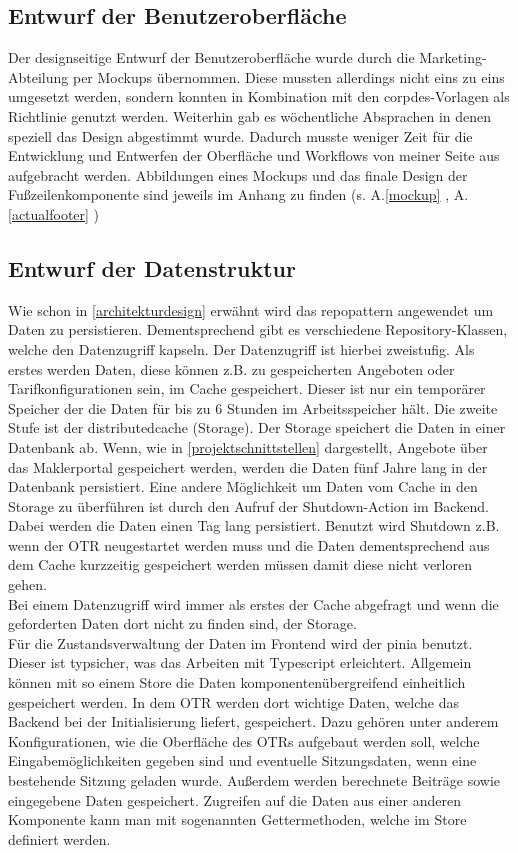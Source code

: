 \subsection{Entwurf der Benutzeroberfläche}
\label{benutzeroberfläche}
Der designseitige Entwurf der Benutzeroberfläche wurde durch die Marketing-Abteilung per Mockups übernommen. Diese mussten allerdings nicht eins zu eins umgesetzt werden, sondern konnten in Kombination mit den \gls{corpdes}-Vorlagen als Richtlinie genutzt werden. Weiterhin gab es wöchentliche Absprachen in denen speziell das Design abgestimmt wurde. Dadurch musste weniger Zeit für die Entwicklung und Entwerfen der Oberfläche und Workflows von meiner Seite aus aufgebracht werden. Abbildungen eines Mockups und das finale Design der Fußzeilenkomponente sind jeweils im Anhang zu finden (s. A.\ref{mockup} , A.\ref{actualfooter} )
\subsection{Entwurf der Datenstruktur}
\label{datenmodell}
Wie schon in \ref{architekturdesign}  erwähnt wird das \gls{repopattern} angewendet um Daten zu persistieren. Dementsprechend gibt es verschiedene Repository-Klassen, welche den Datenzugriff kapseln. Der Datenzugriff ist hierbei zweistufig. Als erstes werden Daten, diese können z.B. zu gespeicherten Angeboten oder Tarifkonfigurationen sein, im Cache gespeichert. Dieser ist nur ein temporärer Speicher der die Daten für bis zu 6 Stunden im Arbeitsspeicher hält. Die zweite Stufe ist der \gls{distributedcache} (Storage). Der Storage speichert die Daten in einer Datenbank ab.
Wenn, wie in \ref{projektschnittstellen}  dargestellt, Angebote über das Maklerportal gespeichert werden, werden die Daten fünf Jahre lang in der Datenbank persistiert. Eine andere Möglichkeit um Daten vom Cache in den Storage zu überführen ist durch den Aufruf der Shutdown-Action im Backend. Dabei werden die Daten einen Tag lang persistiert. Benutzt wird Shutdown z.B. wenn der \ac{OTR} neugestartet werden muss und die Daten dementsprechend aus dem Cache kurzzeitig gespeichert werden müssen damit diese nicht verloren gehen.\\
Bei einem Datenzugriff wird immer als erstes der Cache abgefragt und wenn die geforderten Daten dort nicht zu finden sind, der Storage.\\
Für die Zustandsverwaltung der Daten im Frontend wird der \gls{pinia} benutzt. Dieser ist typsicher, was das Arbeiten mit Typescript erleichtert. Allgemein können mit so einem Store die Daten komponentenübergreifend einheitlich gespeichert werden. In dem \ac{OTR} werden dort wichtige Daten, welche das Backend bei der Initialisierung liefert, gespeichert. Dazu gehören unter anderem Konfigurationen, wie die Oberfläche des \ac{OTR}s aufgebaut werden soll, welche Eingabemöglichkeiten gegeben sind und eventuelle Sitzungsdaten, wenn eine bestehende Sitzung geladen wurde. Außerdem werden berechnete Beiträge sowie eingegebene Daten gespeichert. Zugreifen auf die Daten aus einer anderen Komponente kann man mit sogenannten Gettermethoden, welche im Store definiert werden.
